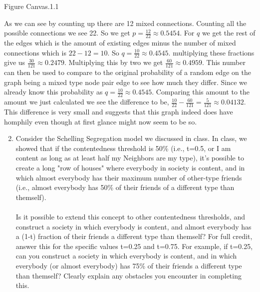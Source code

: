 \documentclass[11pt]{article}
\begin{document}
{\begin{enumerate} 
\begin{center}
                                                                                                                                                                                                                                                                                                                                                                                                                                                                                                          		Figure Canvas.1.1
	\end{center}
As we can see by counting up there are 12 mixed connections.  Counting all the possible connections we see 22.  So we get $p = \frac{12}{22} \approx 0.5454$.  For $q$ we get the rest of the edges which is the amount of existing edges minus the number of mixed connections which is $22 - 12 = 10$.  So $q=\frac{10}{22} \approx 0.4545$.  multiplying these fractions give us $\frac{30}{121} \approx 0.2479$. Multiplying this by two we get $\frac{60}{121} \approx 0.4959$.  This number can then be used to compare to the original probability of a random edge on the graph being a mixed type node pair edge to see how much they differ. Since we already know this probability as $q=\frac{10}{22} \approx 0.4545$.  Comparing this amount to the amount we just calculated we see the difference to be, $\frac{10}{22} - \frac {60}{121} = \frac{5}{121} \approx{0.04132}$.  This difference is very small and suggests that this graph indeed does have homphily even though at first glance might now seem to be so. 
\end {enumerate}}
\begin{enumerate} 
	\setcounter{enumi}{1} 
	\item Consider the Schelling Segregation model we discussed in class. In class, we showed that if the contentedness threshold is 50\% (i.e., t=0.5, or I am content as long as at least half my Neighbors are my type), it's possible to create a long "row of houses" where everybody in society is content, and in which almost everybody has their maximum number of other-type friends (i.e., almost everybody has 50\% of their friends of a different type than themself).\\\\

Is it possible to extend this concept to other contentedness thresholds, and construct a society in which everybody is content, and almost everybody has a (1-t) fraction of their friends a different type than themself? For full credit, answer this for the specific values t=0.25 and t=0.75. For example, if t=0.25, can you construct a society in which everybody is content, and in which everybody (or almost everybody) has 75\% of their friends a different type than themself? Clearly explain any obstacles you encounter in completing this.\\
\end {enumerate}
\end{document}

